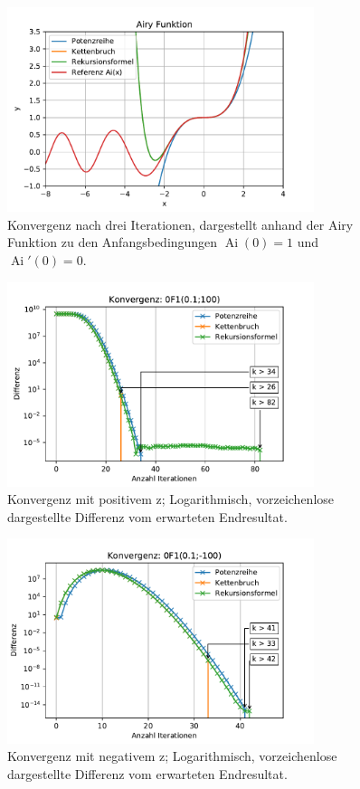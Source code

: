 \begin{figure}
    \centering
    \includegraphics[width=0.8\textwidth]{papers/0f1/images/konvergenzAiry.pdf}
    \caption{Konvergenz nach drei Iterationen, dargestellt anhand der Airy Funktion zu den Anfangsbedingungen $\operatorname{Ai}(0)=1$ und $\operatorname{Ai}'(0)=0$.
    \label{0f1:ausblick:plot:airy:konvergenz}}
\end{figure}

\begin{figure}
    \centering
    \includegraphics[width=0.8\textwidth]{papers/0f1/images/konvergenzPositiv.pdf}
    \caption{Konvergenz mit positivem z; Logarithmisch, vorzeichenlose dargestellte Differenz vom erwarteten Endresultat.
    \label{0f1:ausblick:plot:konvergenz:positiv}}
\end{figure}

\begin{figure}
    \centering
    \includegraphics[width=0.8\textwidth]{papers/0f1/images/konvergenzNegativ.pdf}
    \caption{Konvergenz mit negativem z; Logarithmisch, vorzeichenlose dargestellte Differenz vom erwarteten Endresultat.
    \label{0f1:ausblick:plot:konvergenz:negativ}}
\end{figure}

